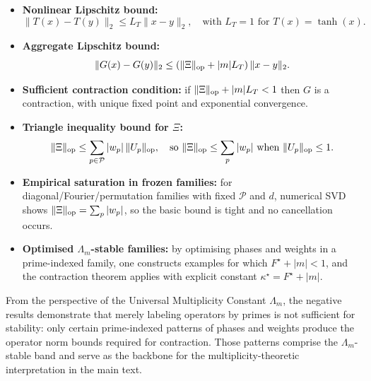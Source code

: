 \documentclass[11pt,letterpaper]{article}
\begin{document}
\begin{itemize}[leftmargin=*]
  \item \textbf{Nonlinear Lipschitz bound:}
    \[
      \|T(x) - T(y)\|_2 \le L_T \|x-y\|_2, \quad \text{with } L_T = 1
      \text{ for } T(x)=\tanh(x).
    \]
  \item \textbf{Aggregate Lipschitz bound:}
    \[
      \|G(x) - G(y)\|_2 \le (\|\Xi\|_{\rm op} + |m|L_T)\,\|x-y\|_2.
    \]
  \item \textbf{Sufficient contraction condition:}
    if \(\|\Xi\|_{\rm op} + |m|L_T < 1\) then \(G\) is a contraction,
    with unique fixed point and exponential convergence.
  \item \textbf{Triangle inequality bound for \(\Xi\):}
    \[
      \|\Xi\|_{\rm op}
      \le \sum_{p\in\mathcal{P}} |w_p|\,\|U_p\|_{\rm op},
      \quad \text{so } \|\Xi\|_{\rm op} \le \sum_{p} |w_p|
      \text{ when } \|U_p\|_{\rm op}\le 1.
    \]
  \item \textbf{Empirical saturation in frozen families:}
    for diagonal/Fourier/permutation families with fixed \(\mathcal{P}\)
    and \(d\), numerical SVD shows
    \(\|\Xi\|_{\rm op} = \sum_{p} |w_p|\), so the basic bound is tight
    and no cancellation occurs.
  \item \textbf{Optimised \(\Lambda_m\)-stable families:}
    by optimising phases and weights in a prime-indexed family, one
    constructs examples for which \(F^\star + |m| < 1\), and the
    contraction theorem applies with explicit constant
    \(\kappa^\star = F^\star + |m|\).
\end{itemize}

From the perspective of the Universal Multiplicity Constant \(\Lambda_m\),
the negative results demonstrate that merely labeling operators by primes
is not sufficient for stability: only certain prime-indexed patterns of
phases and weights produce the operator norm bounds required for
contraction. Those patterns comprise the \(\Lambda_m\)-stable band and
serve as the backbone for the multiplicity-theoretic interpretation in
the main text.

\nocite{*}
  
  
\end{document}
